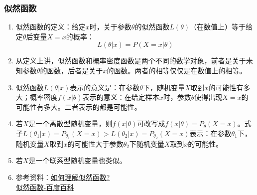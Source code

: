 \subsubsection{似然函数}
\begin{enumerate}
	\item 似然函数的定义：给定$x$时，关于参数$\theta$的似然函数$L(\theta)$（在数值上）等于给定$\theta$后变量$X=x$的概率：
	\begin{equation}
		L(\theta|x) = P(X=x|\theta)
	\end{equation}
	\item 从定义上讲，似然函数和概率密度函数是两个不同的数学对象，前者是关于未知参数$\theta$的函数，后者是关于$x$的函数。两者的相等仅仅是在数值上的相等。
	\item 似然函数$L(\theta|x)$表示的意义是：在参数$\theta$下，随机变量$X$取到$x$的可能性有多大；概率密度$f(x|\theta)$表示的意义：在给定样本$x$时，参数$\theta$使得出现$X=x$的可能性有多大。二者表示的都是可能性。
	\item 若$X$是一个离散型随机变量，则$f(x|\theta)$可改写成$f(x|\theta)=P_\theta(X=x)$。式子$L(\theta_1|x)=P_{\theta_1}(X=x) > L(\theta_2|x)=P_{\theta_2}(X=x)$表示：在参数$\theta_1$下，随机变量$X$取到$x$的可能性大于参数$\theta_2$下随机变量$X$取到$x$的可能性。
	\item 若$X$是一个联系型随机变量也类似。
	\item 参考资料：\href{https://www.zhihu.com/question/54082000}{如何理解似然函数?} \\
	\href{http://baike.baidu.com/subview/1864828/1864828.htm}{似然函数-百度百科}
\end{enumerate}










































